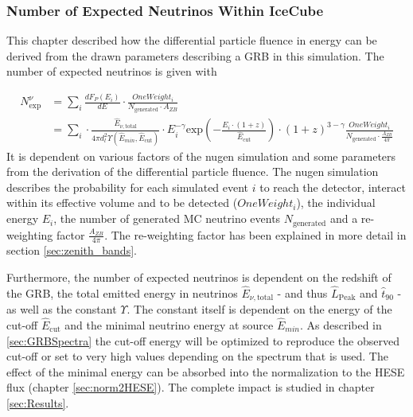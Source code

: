 \subsubsection{Number of Expected Neutrinos Within IceCube}
\label{subsubsec:NExp}
This chapter described how the differential particle fluence in energy can be
derived from the drawn parameters describing a GRB in this simulation. The
number of expected neutrinos is  given with


\begin{equation}
\begin{align}
 N_\text{exp}^\nu & = \sum_i\frac{dF_P(E_i)}{dE} \cdot
\frac{OneWeight_i}{N_\text{generated} \cdot A_{ZB}} \\
&= \sum_i \cdot \frac{\hat{E}_{\nu, \text{total}}}{4 \pi
d_l^2\Upsilon\left(\hat{E}_{min}, \hat{E}_\text{cut}\right)} \cdot
E_i^{-\gamma}
\text{exp} \left( - \frac{E_i \cdot (1+z)}{\hat{E}_\text{cut}} \right) \cdot
(1+z)^{3 - \gamma}
\frac{OneWeight_i}{N_\text{generated} \cdot \frac{A_{ZB}}{4 \pi}}
\end{align}
\end{equation}
It is dependent on various factors of the nugen simulation and some parameters
from the derivation of the differential particle fluence. The nugen simulation
describes the probability for each simulated event $i$ to reach the detector,
interact within its effective volume and to be detected ($OneWeight_i$), the
individual energy $E_i$, the number of generated MC neutrino events
$N_\text{generated}$ and a re-weighting factor $\frac{A_{ZB}}{4 \pi}$. The
re-weighting factor has been explained in more detail in section  
\ref{sec:zenith_bands}.

Furthermore, the number of expected neutrinos is dependent on the redshift of
the GRB, the total emitted energy in neutrinos $\hat{E}_{\nu, \text{total}}$ -
and thus $\hat{L}_\text{Peak}$ and $\hat{t}_{90}$ - as well as the constant
$\Upsilon$. The constant itself is dependent on the energy of the cut-off
$\hat{E}_\text{cut}$ and the minimal neutrino energy at source $\hat{E}_{min}$.
As described in \ref{sec:GRBSpectra}
the cut-off energy will be optimized to reproduce the
observed cut-off or set to very high values depending on the spectrum that is
used. The effect of the minimal energy can be absorbed into
the normalization to the HESE flux (chapter \ref{sec:norm2HESE}). The complete 
impact is studied in chapter \ref{sec:Results}.